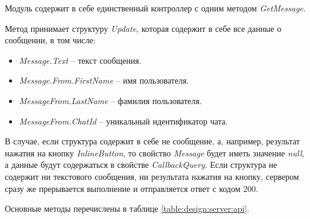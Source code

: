 Модуль содержит в себе единственный контроллер с одним методом \emph{GetMessage}.

Метод принимает структуру \emph{Update}, которая содержит в себе все данные о сообщении, в том числе:

\begin{itemize}
	\item \emph{Message.Text} – текст сообщения.
	\item \emph{Message.From.FirstName} – имя пользователя.
	\item \emph{MessageFrom.LastName} – фамилия пользователя.
	\item \emph{MessageFrom.ChatId} – уникальный идентификатор чата.
\end{itemize}

В случае, если структура содержит в себе не сообщение, а, например, результат нажатия на кнопку \emph{InlineButton}, то свойство \emph{Message} будет иметь значение \emph{null}, а данные будут содержаться в свойстве \emph{CallbackQuery}.
Если структура не содержит ни текстового сообщения, ни результата нажатия на кнопку, сервером сразу же прерывается выполнение и отправляется ответ с кодом 200.

Основные методы перечислены в таблице \ref{table:design:server:api}.

